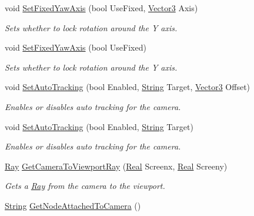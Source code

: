 \begin{DoxyCompactItemize}
void \hyperlink{classphys_1_1Camera_a0fe097fbabbe1a88881f25bc827cabf5}{SetFixedYawAxis} (bool UseFixed, \hyperlink{classphys_1_1Vector3}{Vector3} Axis)
\begin{DoxyCompactList}\small\item\em Sets whether to lock rotation around the Y axis. \item\end{DoxyCompactList}\item 
void \hyperlink{classphys_1_1Camera_a1b4d5be85c528541c7a1cbebb41bfd89}{SetFixedYawAxis} (bool UseFixed)
\begin{DoxyCompactList}\small\item\em Sets whether to lock rotation around the Y axis. \item\end{DoxyCompactList}\item 
void \hyperlink{classphys_1_1Camera_ad49538281af9940dca156113cf006137}{SetAutoTracking} (bool Enabled, \hyperlink{namespacephys_aa03900411993de7fbfec4789bc1d392e}{String} Target, \hyperlink{classphys_1_1Vector3}{Vector3} Offset)
\begin{DoxyCompactList}\small\item\em Enables or disables auto tracking for the camera. \item\end{DoxyCompactList}\item 
void \hyperlink{classphys_1_1Camera_a5f66e37056f03767b6048f8bd4465983}{SetAutoTracking} (bool Enabled, \hyperlink{namespacephys_aa03900411993de7fbfec4789bc1d392e}{String} Target)
\begin{DoxyCompactList}\small\item\em Enables or disables auto tracking for the camera. \item\end{DoxyCompactList}\item 
\hyperlink{classphys_1_1Ray}{Ray} \hyperlink{classphys_1_1Camera_a47c437c8755301512c2757f879e03e73}{GetCameraToViewportRay} (\hyperlink{namespacephys_af7eb897198d265b8e868f45240230d5f}{Real} Screenx, \hyperlink{namespacephys_af7eb897198d265b8e868f45240230d5f}{Real} Screeny)
\begin{DoxyCompactList}\small\item\em Gets a \hyperlink{classphys_1_1Ray}{Ray} from the camera to the viewport. \item\end{DoxyCompactList}\item 
\hyperlink{namespacephys_aa03900411993de7fbfec4789bc1d392e}{String} \hyperlink{classphys_1_1Camera_ab32a8c708e5e22f65dde9ab821ea20fc}{GetNodeAttachedToCamera} ()

\end{DoxyCompactItemize}
